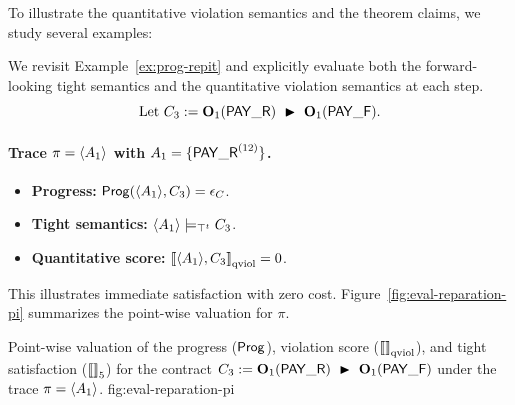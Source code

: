 To illustrate the quantitative violation semantics and the theorem claims, we study several examples:

\begin{example}\label{ex:eval-reparation}
We revisit Example~\ref{ex:prog-repit} and explicitly evaluate both the forward-looking tight semantics and the quantitative violation semantics at each step.
$$\text{Let }
C_3 := \obl[1]{\PAY}\ \repair\ \obl[1]{\PAYF}.$$
\paragraph{Trace $\pi = \trace{A_1}$ with $A_1=\{\PAY^{(12)}\}$.}
\begin{itemize}
  \item \textbf{Progress:} $\Prog(\trace{A_1},C_3)=\emptc$.
  \item \textbf{Tight semantics:} $\trace{A_1} \satt C_3$.
  \item \textbf{Quantitative score:} $\qsem{\trace{A_1},C_3}=0$.
\end{itemize}
This illustrates immediate satisfaction with zero cost.
Figure~\ref{fig:eval-reparation-pi} summarizes the point-wise valuation for $\pi$.

{Point-wise valuation of the progress ($\Prog$), violation score ($\qsem{}$), and tight satisfaction ($\semfive{}$) for the contract $C_3 := \obl[1]{\PAY}\ \repair\ \obl[1]{\PAYF}$ under the trace $\pi=\trace{A_1}$.}
{fig:eval-reparation-pi}
{\vspace{8pt}}{\vspace{-12pt}}


\end{example}
